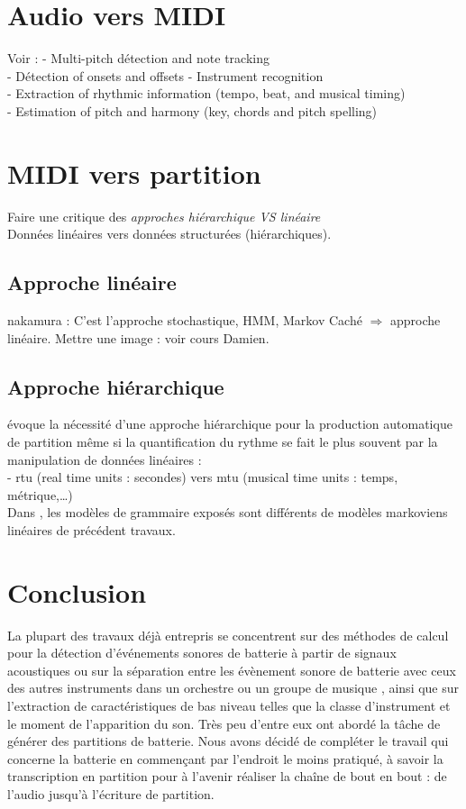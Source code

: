 \section{Audio vers MIDI}
Voir : \cite{article1}
- Multi-pitch détection and note tracking\\
- Détection of onsets and offsets
- Instrument recognition\\
- Extraction of rhythmic information (tempo, beat, and musical timing)\\
- Estimation of pitch and harmony (key, chords and pitch spelling)
\section{MIDI vers partition}
Faire une critique des \textit{approches hiérarchique VS linéaire}\\
Données linéaires vers données structurées (hiérarchiques).
\subsection{Approche linéaire}
nakamura \cite{SHIBATA2021262} : C’est l’approche stochastique, HMM, Markov Caché $\Rightarrow$ approche linéaire.
Mettre une image : voir cours Damien.
\subsection{Approche hiérarchique}
\cite{foscarin:hal-01988990} évoque la nécessité d’une approche hiérarchique pour la production automatique de partition même si la quantification du rythme se fait le plus souvent par la manipulation de données linéaires :\\
- rtu (real time units : secondes) vers mtu (musical time units : temps, métrique,…)\\
Dans \cite{foscarin:hal-01988990}, les modèles de grammaire exposés sont différents de modèles markoviens linéaires de précédent travaux.
\cite{harasimjazz}
\cite{rohrmeier2020towards}
\section*{Conclusion}
La plupart des travaux déjà entrepris se concentrent sur des méthodes de calcul pour la détection d'événements sonores de batterie à partir de signaux acoustiques ou sur la séparation entre les évènement sonore de batterie avec ceux des autres instruments dans un orchestre ou un groupe de musique \cite{2802}, ainsi que sur l'extraction de caractéristiques de bas niveau telles que la classe d'instrument et le moment de l'apparition du son. Très peu d'entre eux ont abordé la tâche de générer des partitions de batterie.
Nous avons décidé de compléter le travail qui concerne la batterie en commençant par l’endroit le moins pratiqué, à savoir la transcription en partition pour à l’avenir réaliser la chaîne de bout en bout : de l’audio jusqu’à l’écriture de partition.